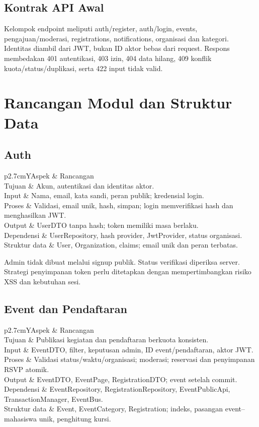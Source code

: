 \documentclass[11pt,a4paper]{article}
\newcommand{\tbl}[2]{\par\smallskip\noindent\begin{tabularx}{\linewidth}{#1}\toprule #2\bottomrule\end{tabularx}\par\smallskip}
\newcommand{\page}[1]{\clearpage\section{#1}}
\begin{document}
\subsection{Kontrak API Awal}
Kelompok endpoint meliputi auth/register, auth/login, events, pengajuan/moderasi, registrations, notifications, organisasi dan kategori. Identitas diambil dari JWT, bukan ID aktor bebas dari request. Respons membedakan 401 autentikasi, 403 izin, 404 data hilang, 409 konflik kuota/status/duplikasi, serta 422 input tidak valid.
\page{Rancangan Modul dan Struktur Data}
\subsection{Auth}
\tbl{p{2.7cm}Y}{Aspek & Rancangan\\\midrule
Tujuan & Akun, autentikasi dan identitas aktor.\\
Input & Nama, email, kata sandi, peran publik; kredensial login.\\
Proses & Validasi, email unik, hash, simpan; login memverifikasi hash dan menghasilkan JWT.\\
Output & UserDTO tanpa hash; token memiliki masa berlaku.\\
Dependensi & UserRepository, hash provider, JwtProvider, status organisasi.\\
Struktur data & User, Organization, claims; email unik dan peran terbatas.\\}
Admin tidak dibuat melalui signup publik. Status verifikasi diperiksa server. Strategi penyimpanan token perlu ditetapkan dengan mempertimbangkan risiko XSS dan kebutuhan sesi.
\subsection{Event dan Pendaftaran}
\tbl{p{2.7cm}Y}{Aspek & Rancangan\\\midrule
Tujuan & Publikasi kegiatan dan pendaftaran berkuota konsisten.\\
Input & EventDTO, filter, keputusan admin, ID event/pendaftaran, aktor JWT.\\
Proses & Validasi status/waktu/organisasi; moderasi; reservasi dan penyimpanan RSVP atomik.\\
Output & EventDTO, EventPage, RegistrationDTO; event setelah commit.\\
Dependensi & EventRepository, RegistrationRepository, EventPublicApi, TransactionManager, EventBus.\\
Struktur data & Event, EventCategory, Registration; indeks, pasangan event--mahasiswa unik, penghitung kursi.\\}
\end{document}

